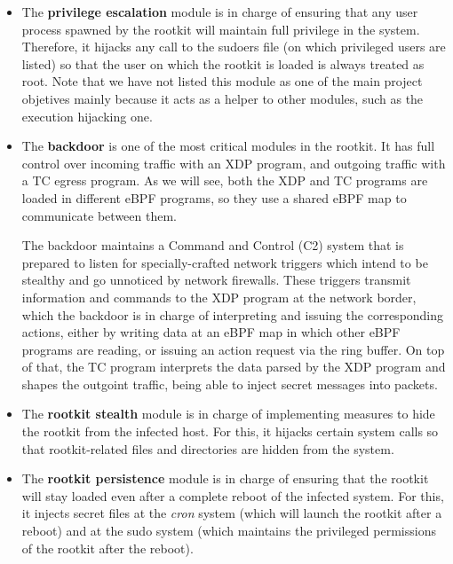 \begin{itemize}
\item The \textbf{privilege escalation} module is in charge of ensuring that any user process spawned by the rootkit will maintain full privilege in the system. Therefore, it hijacks any call to the sudoers file (on which privileged users are listed) so that the user on which the rootkit is loaded is always treated as root. Note that we have not listed this module as one of the main project objetives mainly because it acts as a helper to other modules, such as the execution hijacking one.

\item The \textbf{backdoor} is one of the most critical modules in the rootkit. It has full control over incoming traffic with an XDP program, and outgoing traffic with a TC egress program. As we will see, both the XDP and TC programs are loaded in different eBPF programs, so they use a shared eBPF map to communicate between them.

The backdoor maintains a Command and Control (C2) system that is prepared to listen for specially-crafted network triggers which intend to be stealthy and go unnoticed by network firewalls. These triggers transmit information and commands to the XDP program at the network border, which the backdoor is in charge of interpreting and issuing the corresponding actions, either by writing data at an eBPF map in which other eBPF programs are reading, or issuing an action request via the ring buffer. On top of that, the TC program interprets the data parsed by the XDP program and shapes the outgoint traffic, being able to inject secret messages into packets. 

\item The \textbf{rootkit stealth} module is in charge of implementing measures to hide the rootkit from the infected host. For this, it hijacks certain system calls so that rootkit-related files and directories are hidden from the system.

\item The \textbf{rootkit persistence} module is in charge of ensuring that the rootkit will stay loaded even after a complete reboot of the infected system. For this, it injects secret files at the \textit{cron} system (which will launch the rootkit after a reboot) and at the sudo system (which maintains the privileged permissions of the rootkit after the reboot).


\end{itemize}
